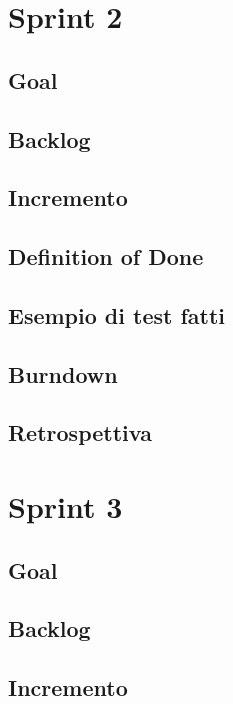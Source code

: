 \documentclass{article}
\begin{document}
\section{Sprint 2}

\subsection{Goal}

\subsection{Backlog}

\subsection{Incremento}

\subsection{Definition of Done}

\subsection{Esempio di test fatti}

\subsection{Burndown}

\subsection{Retrospettiva}

\section{Sprint 3}

\subsection{Goal}

\subsection{Backlog}

\subsection{Incremento}
\end{document}
